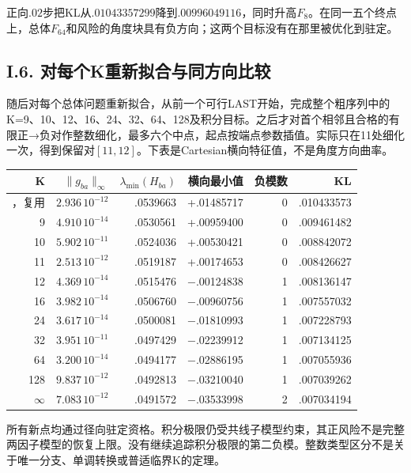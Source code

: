 \documentclass[11pt,a4paper]{article}
\begin{document}
正向\(.02\)步把KL从\(.01043357299\)降到\(.00996049116\)，同时升高\(F_8\)。在同一五个终点上，总体\(F_{64}\)和风险的角度块具有负方向；这两个目标没有在那里被优化到驻定。

\subsection*{I.6.
对每个K重新拟合与同方向比较}\label{i.6.-ux5bf9ux6bcfux4e2akux91cdux65b0ux62dfux5408ux4e0eux540cux65b9ux5411ux6bd4ux8f83}

随后对每个总体问题重新拟合，从前一个可行LAST开始，完成整个粗序列中的K=9、10、12、16、24、32、64、128及积分目标。之后才对首个相邻且合格的有限正→负对作整数细化，最多六个中点，起点按端点参数插值。实际只在11处细化一次，得到保留对\([11,12]\)。下表是Cartesian横向特征值，不是角度方向曲率。

\begin{longtable}[]{@{}rrrrrr@{}}
\toprule\noalign{}
K & \(\|g_{ba}\|_\infty\) & \(\lambda_{\min}(H_{ba})\) & 横向最小值 &
负模数 & KL \\
\midrule\noalign{}
\endhead
\bottomrule\noalign{}
\endlastfoot
8，复用 & \(2.936\,10^{-12}\) & .0539663 & +.01485717 & 0 &
.010433573 \\
9 & \(4.910\,10^{-14}\) & .0530561 & +.00959400 & 0 & .009461482 \\
10 & \(5.902\,10^{-11}\) & .0524036 & +.00530421 & 0 & .008842072 \\
11 & \(2.513\,10^{-12}\) & .0519187 & +.00174653 & 0 & .008426627 \\
12 & \(4.369\,10^{-14}\) & .0515476 & −.00124838 & 1 & .008136147 \\
16 & \(3.982\,10^{-14}\) & .0506760 & −.00960756 & 1 & .007557032 \\
24 & \(3.617\,10^{-14}\) & .0500081 & −.01810993 & 1 & .007228793 \\
32 & \(3.951\,10^{-11}\) & .0497429 & −.02239912 & 1 & .007134125 \\
64 & \(3.200\,10^{-14}\) & .0494177 & −.02886195 & 1 & .007055936 \\
128 & \(9.837\,10^{-12}\) & .0492813 & −.03210040 & 1 & .007039262 \\
\(\infty\) & \(7.083\,10^{-12}\) & .0491572 & −.03533998 & 2 &
.007034194 \\
\end{longtable}

所有新点均通过径向驻定资格。积分极限仍受共线子模型约束，其正风险不是完整两因子模型的恢复上限。没有继续追踪积分极限的第二负模。整数类型区分不是关于唯一分支、单调转换或普适临界K的定理。
\end{document}
